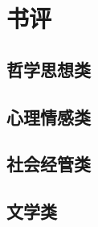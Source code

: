 \listoffigures

\clearpage

\listoftables

\clearpage


\chapter{书评}

\section{哲学思想类}






















\clearpage

\section{心理情感类}


\clearpage

\section{社会经管类}














\clearpage

\section{文学类}

